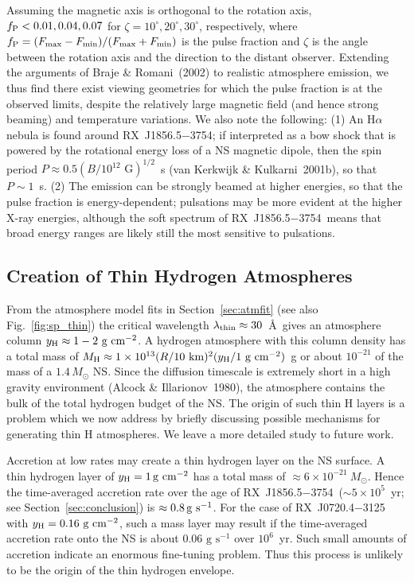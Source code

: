 \documentclass[useAMS,usegraphicx]{mn2e}
\newcommand{\rxjw}{RX~J1856.5$-$3754}
\newcommand{\ycol}{y_{\rm H}}
\newcommand{\lambatm}{\lambda_{\rm thin}}
\begin{document}
Assuming the magnetic axis is orthogonal to the rotation axis,
$f_{\rm P}< 0.01, 0.04, 0.07$ for $\zeta=10^\circ, 20^\circ, 30^\circ$,
respectively, where
$f_{\rm P}=(F_{\rm max}-F_{\rm min})/(F_{\rm max}+F_{\rm min})$
is the pulse fraction and
$\zeta$ is the angle between the rotation axis and the direction to
the distant observer.
Extending the arguments of Braje \& Romani~(2002) to realistic atmosphere
emission, we thus find there exist viewing geometries for which the
pulse fraction is at the observed limits, despite the relatively large
magnetic field (and hence strong beaming) and temperature variations.
We also note the following:
(1) An H$\alpha$ nebula is found around \rxjw; if interpreted as a bow shock
that is powered by the rotational energy loss of a NS magnetic dipole,
then the spin period $P\approx 0.5(B/10^{12}\mbox{ G})^{1/2}$~s
(van Kerkwijk \& Kulkarni~2001b), so that $P\sim 1$~s.
(2) The emission can be strongly beamed at higher energies, so that
the pulse fraction is energy-dependent; pulsations may be more
evident at the higher X-ray energies, although the soft spectrum of
\rxjw\ means that broad energy ranges are likely still the most sensitive
to pulsations.

\subsection{Creation of Thin Hydrogen Atmospheres}
\label{sec:dnb}
 
From the atmosphere model fits in Section~\ref{sec:atmfit}
(see also Fig.~\ref{fig:sp_thin})
the critical wavelength $\lambatm\approx 30$~\AA\
gives an atmosphere column $\ycol\approx 1-2\mbox{ g cm$^{-2}$}$.
A hydrogen atmosphere with this column density has a
total mass of $M_{\rm H}\approx 1\times 10^{13}(R/10\mbox{ km})^2
(\ycol/1\mbox{ g cm$^{-2}$})$~g or about $10^{-21}$ of
the mass of a $1.4\,M_{\odot}$ NS.  Since the diffusion timescale
is extremely short in a high gravity environment (Alcock \& Illarionov~1980),
the atmosphere contains the bulk of the total hydrogen budget of the NS.
The origin of such thin H layers is a problem which we now address by
briefly discussing possible mechanisms for generating thin H atmospheres.
We leave a more detailed study to future work.

Accretion at low rates may create a thin hydrogen layer on the
NS surface.  A thin hydrogen layer of $\ycol = 1\,{\rm g\ cm}^{-2}$
has a total mass of $\approx 6\times 10^{-21}\ M_{\odot}$.  Hence the
time-averaged accretion rate over the age of \rxjw\ ($\sim 5 \times 10^5$~yr;
see Section~\ref{sec:conclusion}) is $\approx 0.8\,{\rm g\ s}^{-1}$.
For the case of RX~J0720.4$-$3125 with $\ycol=0.16\mbox{ g cm$^{-2}$}$,
such a mass layer may result if the time-averaged accretion rate onto
the NS is about $0.06\mbox{ g s$^{-1}$}$ over $10^6$~yr.
Such small amounts of accretion indicate an enormous fine-tuning
problem.  Thus this process is unlikely to be the origin of the thin
hydrogen envelope.
 
\end{document}
